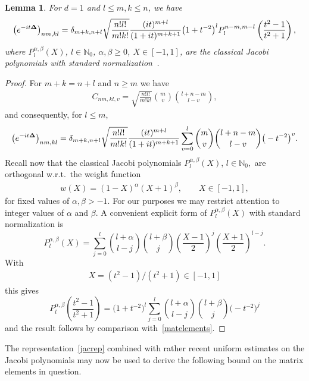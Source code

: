 \documentclass[10pt,a4paper]{amsart}
\newtheorem{lemma}{Lemma}
\begin{document}
\begin{lemma}
\label{jacobi}
For $d=1$ and $l\leq m,k\leq n$, we have
\begin{gather}\label{jacrep}
\left(e^{-it{\bf\Delta}}\right)_{nm,kl}=
\delta_{m+k,n+l}
\sqrt{\frac{n! l!}{m! k!}}
\frac{(it)^{m+l}}{(1+it)^{m+k+1}}\big(1+t^{-2}\big)^l
  P_{l}^{n-m,m-l}\left(\frac{t^2-1}{t^2+1}\right) ,
\end{gather}
where $P_l^{\alpha,\beta}(X)$, $l\in\mathbb N_0$, $\alpha,\beta\geq 0$,
$X\in[-1,1]$, are the classical Jacobi polynomials with standard
normalization~{\rm \cite{Szego}}.
\end{lemma}

\begin{proof}
For  $m+k=n+l$ and $n\geq m$ we have
\begin{gather*}
C_{nm,kl,v}
=\sqrt{\frac{n! l!}{m! k!}}{m\choose v}{l+n-m\choose l-v},
\end{gather*}
and consequently, for $l\leq m$,
\begin{gather}
\label{matelements}
\left(e^{-it{\bf\Delta}}\right)_{nm,kl}=
\delta_{m+k,n+l}\sqrt{\frac{n! l!}{m! k!}}
\frac{(it)^{m+l}}{(1+it)^{m+k+1}}
\sum_{v=0}^{l} {m\choose v}{l+n-m\choose l-v}
 \big(-t^{-2}\big)^{v} .
\end{gather}
Recall now \cite{Szego} that the classical Jacobi polynomials
$P_l^{\alpha,\beta}(X)$, $l\in\mathbb N_0,$ are orthogonal
w.r.t.\ the weight function
\begin{gather}\label{weight}
w(X)   =  (1-X)^\alpha(X+1)^\beta,\qquad X\in[-1,1],
\end{gather}
for f\/ixed values of $\alpha, \beta > -1$. For our purposes we may
restrict attention to integer values of $\alpha$ and  $\beta$. A  convenient
explicit form of $P_l^{\alpha,\beta}(X)$ with standard normalization is
\[
P_l^{\alpha,\beta}(X)=\sum_{j=0}^l{l+\alpha\choose l-j}{l+\beta\choose
  j}\left(\frac{X-1}{2}\right)^j\left(\frac{X+1}{2}\right)^{l-j} .
\]
With
\begin{gather}\label{X-t}
X=(t^2-1)/(t^2+1)\in [-1,1]
\end{gather}
this gives
\[
P_l^{\alpha,\beta}\left(\frac{t^2-1}{t^2+1}\right)
= \big(1+t^{-2}\big)^l\sum_{j=0}^l{l+\alpha\choose l-j}
{l+\beta\choose j}\big(-t^{-2}\big)^{j}
\]
and the result follows by comparison with~\eqref{matelements}.
\end{proof}

The representation~\eqref{jacrep} combined with rather recent
uniform estimates on the Jacobi polynomials may now be used to derive the
following bound on the matrix elements in question.
\end{document}
